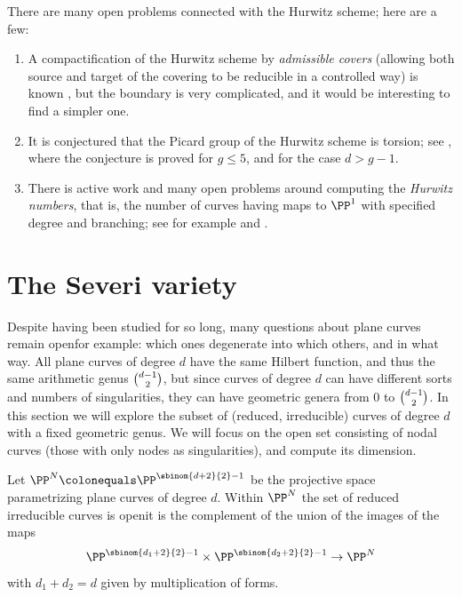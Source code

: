 There are many open problems connected with the Hurwitz scheme; here are a few:
\begin{enumerate}
\item A compactification of the Hurwitz scheme by
%
\emph{admissible covers}
(allowing both source and target
of the covering to be reducible in a controlled way) is known \cite{MR1631825}, but the boundary is very complicated, and it would be interesting to find a simpler one.

\item It is conjectured that the
Picard group
%
of the Hurwitz scheme is torsion; see \cite{MR3320849},
where the conjecture is proved
for $g\leq 5$, and \cite{mullane} for the case $d>g-1$.

\item There is active work and many open problems around computing the
\emph{Hurwitz numbers},
%
that is,
the number of curves having maps to $\PP^{1}$ with specified degree and branching; see for example \cite{Hurwitz2} and \cite{ELSV}.
%
\end{enumerate}

\section{The Severi variety}\label{severi variety}

Despite having been studied for so long, many questions about plane
curves remain open\emdash for example: which ones degenerate into
which others, and in what way. All plane curves of degree $d$ have the
same Hilbert function, and thus the same
arithmetic genus
%
$\tbinom{d-1}{2}$, but since curves of degree $d$ can have different
sorts and numbers of singularities, they can have geometric genera
from 0 to $\tbinom{d-1}{2}$. In this section we will explore the
subset of (reduced, irreducible) curves of degree $d$ with a fixed
%
geometric genus. We will focus on the open set consisting of
nodal curves (those with only nodes as singularities),
and compute its dimension.

\def\Vdg{V_{\mskip-6mu d,g}}
\def\Vdgbar{\overkern1{17}{\Vdg}}
\def\Vdgpbar{\overkern1{19}{V_{\smash{\!d,g'`}}}}

Let $\PP^N \colonequals  \PP^{\sbinom{d+2}{ 2} - 1}$ be the projective space parametrizing plane curves of degree $d$.
Within $\PP^N$ the set of reduced irreducible curves is open\emdash it is the complement of the union of the images of the maps
$$
\PP^{\sbinom{d_1+2}{ 2} - 1}\times\PP^{\sbinom{d_2+2}{ 2}-1} \to \PP^N
$$
with $d_1+d_2 = d$ given by multiplication of forms.

